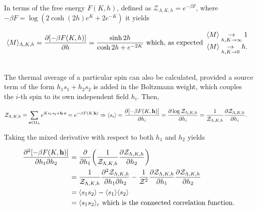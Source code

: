 \documentclass{homework}
\begin{document}
In terms of the free energy $F(K,h)$, defined as $\mathcal{Z}_{\Lambda, K, h} = e^{-\beta F}$, where $-\beta F = \log(2 \cosh(2h) e^{K} + 2e^{-K})$ it yields

\begin{equation}
    \langle M \rangle_{\Lambda, K, h}  = \frac{\partial [-\beta F(K,h)]}{\partial h} = \frac{\sinh 2h}{\cosh 2h + e^{-2K}} \textnormal{ which, as expected} \begin{array}{c}
         \langle M \rangle \underset{h, K \rightarrow \infty}{\rightarrow} 1   \\
         \langle M \rangle \underset{h, K \rightarrow 0}{\rightarrow} h. 
    \end{array}
\end{equation}

\blanky \\

The thermal average of a particular spin can also be calculated, provided a source term of the form $h_1 s_1 + h_2 s_2$ is added in the Boltzmann weight, which couples the $i$-th spin to its own independent field $h_i$. Then,

\begin{align}
    \mathcal{Z}_{\Lambda, K, h} &= \sum_{{\bf s} \in \Omega_\Lambda} e^{K s_1 s_2 + {\bf h} \cdot {\bf s}} = e^{-\beta F(K, {\bf h})} \Rightarrow \langle s_i \rangle = \frac{\partial [-\beta F(K,{\bf h})]}{\partial h_i} = \frac{\partial \log \mathcal{Z}_{\Lambda, K, h}}{\partial h_i} = \frac{1}{\mathcal{Z}_{\Lambda, K, h}} \frac{\partial \mathcal{Z}_{\Lambda, K, h}}{\partial h_i} .
\end{align}

Taking the mixed derivative with respect to both $h_1$ and $h_2$ yields 

\begin{equation}
    \begin{split}
        \frac{\partial^2 [-\beta F(K,{\bf h})]}{\partial h_1 \partial h_2} &= \frac{\partial}{\partial h_1} \bigg(\frac{1}{\mathcal{Z}_{\Lambda, K, h}} \frac{\partial \mathcal{Z}_{\Lambda, K, h}}{\partial h_2} \bigg)  \\
        &= \frac{1}{\mathcal{Z}_{\Lambda, K, h}} \frac{\partial^2 \mathcal{Z}_{\Lambda, K, h}}{\partial h_1 \partial h_2} - \frac{1}{\mathcal{Z}^2} \frac{\partial \mathcal{Z}_{\Lambda, K, h}}{\partial h_1} \frac{\partial \mathcal{Z}_{\Lambda, K, h}}{\partial h_2} \\
        &= \langle s_1 s_2 \rangle - \langle s_1 \rangle \langle s_2 \rangle \\
        &= \langle s_1 s_2 \rangle_c \textnormal{ which is the connected correlation function.}
    \end{split}
\end{equation}
\end{document}
